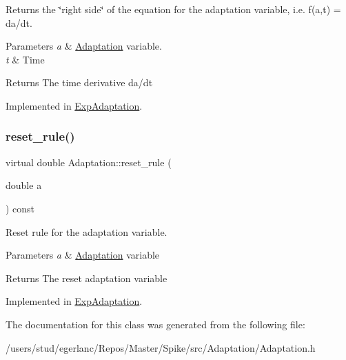 Returns the \char`\"{}right side\char`\"{} of the equation for the adaptation variable, i.\+e. f(a,t) = da/dt. 


\begin{DoxyParams}{Parameters}
{\em a} & \hyperlink{classAdaptation}{Adaptation} variable. \\
\hline
{\em t} & Time \\
\hline
\end{DoxyParams}
\begin{DoxyReturn}{Returns}
The time derivative da/dt 
\end{DoxyReturn}


Implemented in \hyperlink{classExpAdaptation_aef5119a0f09698f1526938f04654e3f4}{Exp\+Adaptation}.

\mbox{\label{classAdaptation_a146da63f54c22a3c08c2c5ce26f11f66}} 
\subsubsection{\texorpdfstring{reset\+\_\+rule()}{reset\_rule()}}
{\footnotesize\ttfamily virtual double Adaptation\+::reset\+\_\+rule (\begin{DoxyParamCaption}\item[{double}]{a }\end{DoxyParamCaption}) const\hspace{0.3cm}{\ttfamily [pure virtual]}}



Reset rule for the adaptation variable. 


\begin{DoxyParams}{Parameters}
{\em a} & \hyperlink{classAdaptation}{Adaptation} variable \\
\hline
\end{DoxyParams}
\begin{DoxyReturn}{Returns}
The reset adaptation variable 
\end{DoxyReturn}


Implemented in \hyperlink{classExpAdaptation_ac194bba0fd15aea6a68b8964a21fff2d}{Exp\+Adaptation}.



The documentation for this class was generated from the following file\+:\begin{DoxyCompactItemize}
\item 
/users/stud/egerlanc/\+Repos/\+Master/\+Spike/src/\+Adaptation/Adaptation.\+h\end{DoxyCompactItemize}
